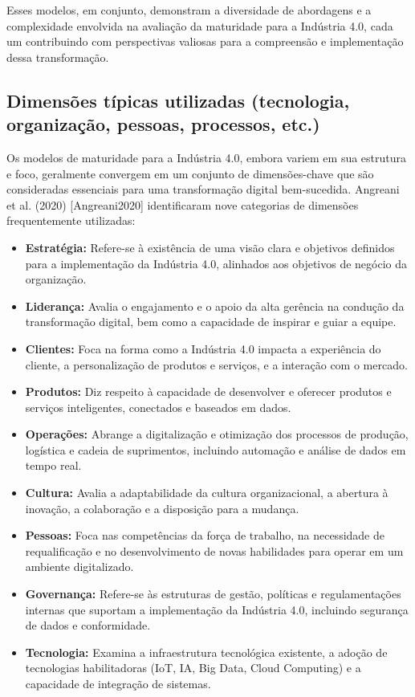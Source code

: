 Esses modelos, em conjunto, demonstram a diversidade de abordagens e a complexidade envolvida na avaliação da maturidade para a Indústria 4.0, cada um contribuindo com perspectivas valiosas para a compreensão e implementação dessa transformação.

\subsection{Dimensões típicas utilizadas (tecnologia, organização, pessoas, processos, etc.)}

Os modelos de maturidade para a Indústria 4.0, embora variem em sua estrutura e foco, geralmente convergem em um conjunto de dimensões-chave que são consideradas essenciais para uma transformação digital bem-sucedida. Angreani et al. (2020) [Angreani2020] identificaram nove categorias de dimensões frequentemente utilizadas:
\begin{itemize}
    \item \textbf{Estratégia:} Refere-se à existência de uma visão clara e objetivos definidos para a implementação da Indústria 4.0, alinhados aos objetivos de negócio da organização.
    \item \textbf{Liderança:} Avalia o engajamento e o apoio da alta gerência na condução da transformação digital, bem como a capacidade de inspirar e guiar a equipe.
    \item \textbf{Clientes:} Foca na forma como a Indústria 4.0 impacta a experiência do cliente, a personalização de produtos e serviços, e a interação com o mercado.
    \item \textbf{Produtos:} Diz respeito à capacidade de desenvolver e oferecer produtos e serviços inteligentes, conectados e baseados em dados.
    \item \textbf{Operações:} Abrange a digitalização e otimização dos processos de produção, logística e cadeia de suprimentos, incluindo automação e análise de dados em tempo real.
    \item \textbf{Cultura:} Avalia a adaptabilidade da cultura organizacional, a abertura à inovação, a colaboração e a disposição para a mudança.
    \item \textbf{Pessoas:} Foca nas competências da força de trabalho, na necessidade de requalificação e no desenvolvimento de novas habilidades para operar em um ambiente digitalizado.
    \item \textbf{Governança:} Refere-se às estruturas de gestão, políticas e regulamentações internas que suportam a implementação da Indústria 4.0, incluindo segurança de dados e conformidade.
    \item \textbf{Tecnologia:} Examina a infraestrutura tecnológica existente, a adoção de tecnologias habilitadoras (IoT, IA, Big Data, Cloud Computing) e a capacidade de integração de sistemas.
\end{itemize}

